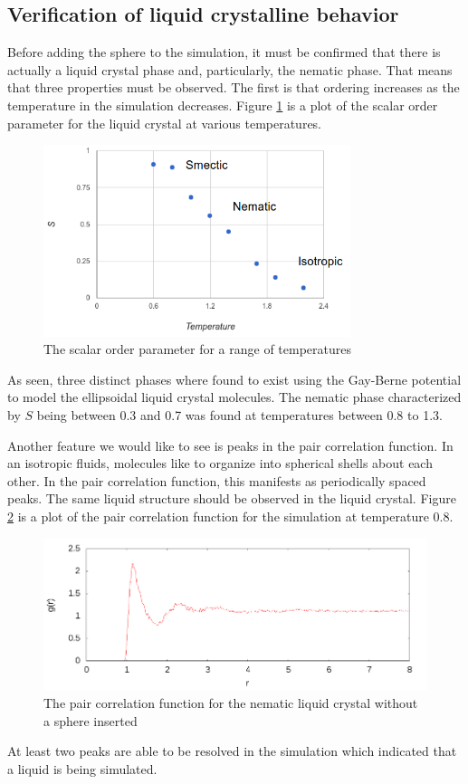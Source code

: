 \documentclass[preprint, aps]{revtex4-1}
\begin{document}
\subsection*{Verification of liquid crystalline behavior}
Before adding the sphere to the simulation, it must be confirmed that there is
actually a liquid crystal phase and, particularly, the nematic phase. That means
that three properties must be observed. The first is that ordering increases as
the temperature in the simulation decreases. Figure \ref{fig:phase} is a plot of
the scalar order parameter for the liquid crystal at various temperatures.
	\begin{figure}[H]
		\centering
		\includegraphics[width=0.8\textwidth]{phase.png}
		\caption{The scalar order parameter for a range of temperatures}
		\label{fig:phase}
	\end{figure}
As seen, three distinct phases where found to exist using the Gay-Berne 
potential to model the ellipsoidal liquid crystal molecules. The nematic phase
characterized by $S$ being between 0.3 and 0.7 was found at temperatures between
0.8 to 1.3.

Another feature we would like to see is peaks in the pair correlation function.
In an isotropic fluids, molecules like to organize into spherical shells about
each other. In the pair correlation function, this manifests as periodically
spaced peaks. The same liquid structure should be observed in the liquid
crystal. Figure \ref{fig:pcf} is a plot of the pair correlation function
for the simulation at temperature 0.8.
	\begin{figure}[H]
		\includegraphics[width=\textwidth]{pcf.png}
		\caption{The pair correlation function for the nematic liquid crystal
		without a sphere inserted}
		\label{fig:pcf}
	\end{figure}
At least two peaks are able to be resolved in the simulation which indicated
that a liquid is being simulated.
\end{document}
